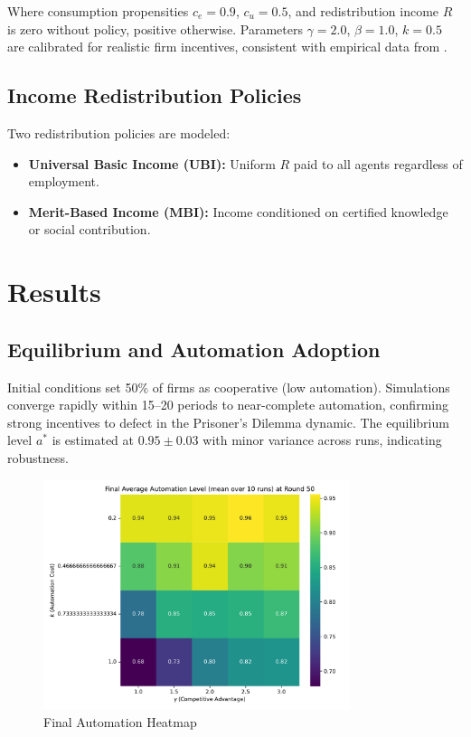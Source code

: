 \documentclass[10pt,a4paper]{article}
\begin{document}
Where consumption propensities \(c_e = 0.9\), \(c_u = 0.5\), and redistribution income \(R\) is zero without policy, positive otherwise. Parameters \(\gamma=2.0\), \(\beta=1.0\), \(k=0.5\) are calibrated for realistic firm incentives, consistent with empirical data from \cite{StanfordAI2025}.

\subsection{Income Redistribution Policies}
Two redistribution policies are modeled:
\begin{itemize}
    \item \textbf{Universal Basic Income (UBI):} Uniform \(R\) paid to all agents regardless of employment.
    \item \textbf{Merit-Based Income (MBI):} Income conditioned on certified knowledge or social contribution.
\end{itemize}

\section{Results}

\subsection{Equilibrium and Automation Adoption}
Initial conditions set 50\% of firms as cooperative (low automation). Simulations converge rapidly within 15--20 periods to near-complete automation, confirming strong incentives to defect in the Prisoner’s Dilemma dynamic. The equilibrium level \(a^*\) is estimated at \(0.95 \pm 0.03\) with minor variance across runs, indicating robustness.

\begin{figure}[h]
    \centering
    \includegraphics[width=0.8\textwidth]{final_automation_heatmap.pdf}
    \caption{Final Automation Heatmap}
    \label{fig:heatmap}
\end{figure}
\end{document}
